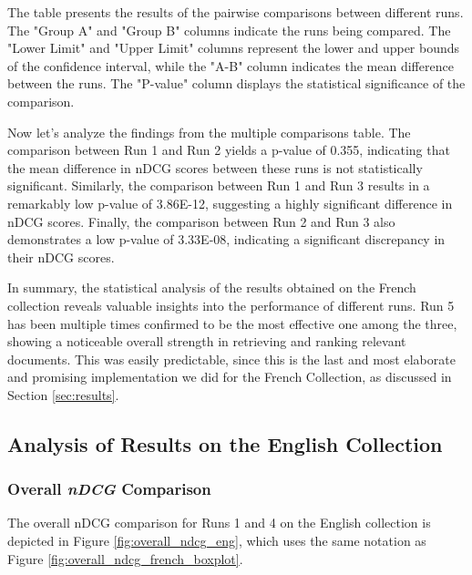 The table presents the results of the pairwise comparisons between different runs. 
The "Group A" and "Group B" columns indicate the runs being compared. 
The "Lower Limit" and "Upper Limit" columns represent the lower and upper bounds of the confidence interval, while the "A-B" column indicates the mean difference between the runs. 
The "P-value" column displays the statistical significance of the comparison.

Now let's analyze the findings from the multiple comparisons table. 
The comparison between Run 1 and Run 2 yields a p-value of 0.355, indicating that the mean difference in \ac{nDCG} scores between these runs is not statistically significant. 
Similarly, the comparison between Run 1 and Run 3 results in a remarkably low p-value of 3.86E-12, suggesting a highly significant difference in \ac{nDCG} scores. 
Finally, the comparison between Run 2 and Run 3 also demonstrates a low p-value of 3.33E-08, indicating a significant discrepancy in their \ac{nDCG} scores.

In summary, the statistical analysis of the results obtained on the French collection reveals valuable insights into the performance of different runs. 
Run 5 has been multiple times confirmed to be the most effective one among the three, showing a noticeable overall strength in retrieving and ranking relevant documents.
This was easily predictable, since this is the last and most elaborate and promising implementation we did for the French Collection, as discussed in Section \ref{sec:results}.   


\subsection{Analysis of Results on the English Collection}

\subsubsection{Overall \textit{nDCG} Comparison} \label{sec:ndcg_comparison_eng}

The overall \ac{nDCG} comparison for Runs 1 and 4 on the English collection is depicted in Figure \ref{fig:overall_ndcg_eng}, which uses the same notation as Figure \ref{fig:overall_ndcg_french_boxplot}.

